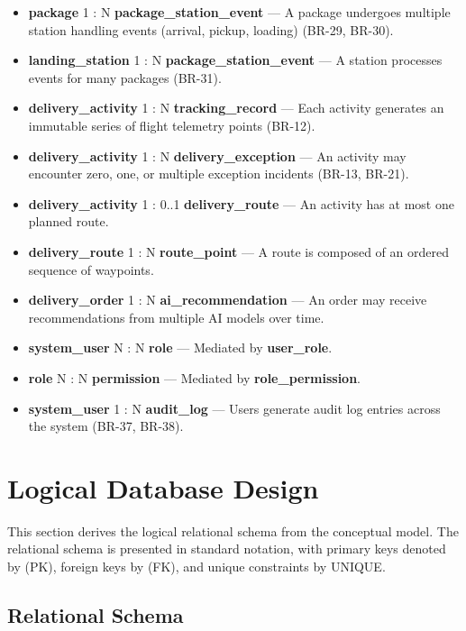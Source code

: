 \begin{itemize}
    \item \textbf{package} 1 : N \textbf{package\_station\_event} — A package undergoes multiple station handling events (arrival, pickup, loading) (BR-29, BR-30).
    \item \textbf{landing\_station} 1 : N \textbf{package\_station\_event} — A station processes events for many packages (BR-31).
    \item \textbf{delivery\_activity} 1 : N \textbf{tracking\_record} — Each activity generates an immutable series of flight telemetry points (BR-12).
    \item \textbf{delivery\_activity} 1 : N \textbf{delivery\_exception} — An activity may encounter zero, one, or multiple exception incidents (BR-13, BR-21).
    \item \textbf{delivery\_activity} 1 : 0..1 \textbf{delivery\_route} — An activity has at most one planned route.
    \item \textbf{delivery\_route} 1 : N \textbf{route\_point} — A route is composed of an ordered sequence of waypoints.
    \item \textbf{delivery\_order} 1 : N \textbf{ai\_recommendation} — An order may receive recommendations from multiple AI models over time.
    \item \textbf{system\_user} N : N \textbf{role} — Mediated by \textbf{user\_role}.
    \item \textbf{role} N : N \textbf{permission} — Mediated by \textbf{role\_permission}.
    \item \textbf{system\_user} 1 : N \textbf{audit\_log} — Users generate audit log entries across the system (BR-37, BR-38).
\end{itemize}

\section{Logical Database Design}\label{s:logical}

This section derives the logical relational schema from the conceptual model. The relational schema is presented in standard notation, with primary keys denoted by (PK), foreign keys by (FK), and unique constraints by UNIQUE.

\subsection{Relational Schema}

